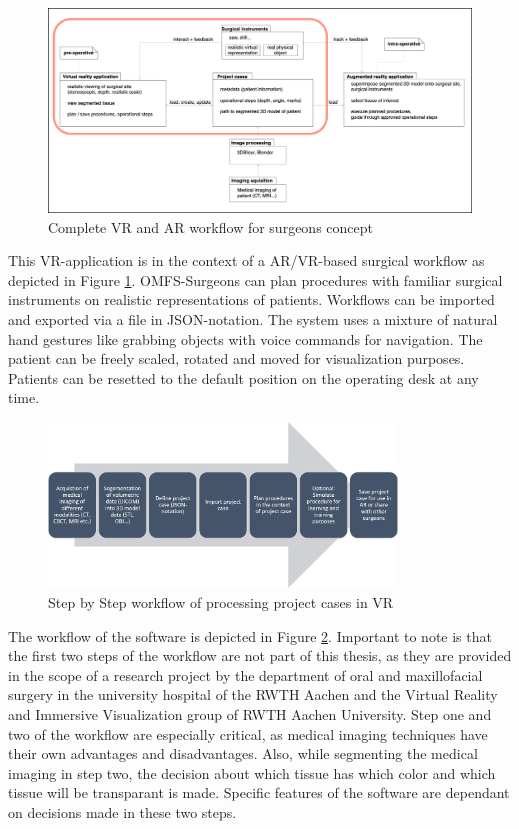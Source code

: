 \begin{figure}[ht]
    \centering
    \includegraphics[width=\linewidth]{images/project_plan.png}
    \caption{\label{fig::ProjectPlan} Complete VR and AR workflow for surgeons concept}
\end{figure}

This VR-application is in the context of a AR/VR-based surgical workflow as depicted in Figure \ref{fig::ProjectPlan}.
OMFS-Surgeons can plan procedures with familiar surgical instruments on realistic representations of patients.
Workflows can be imported and exported via a file in JSON-notation.
The system uses a mixture of natural hand gestures like grabbing objects with voice commands for navigation.
The patient can be freely scaled, rotated and moved for visualization purposes.
Patients can be resetted to the default position on the operating desk at any time.

\begin{figure}[ht]
    \centering
    \includegraphics[width=350px]{images/implementation/workflow.png}
    \caption{\label{fig::ImplementationWorkflow}Step by Step workflow of processing project cases in VR}
\end{figure}

The workflow of the software is depicted in Figure \ref{fig::ImplementationWorkflow}.
Important to note is that the first two steps of the workflow are not part of this thesis, as they are provided in the scope of a research project by the department of oral and maxillofacial surgery in the university hospital of the RWTH Aachen and the Virtual Reality and Immersive Visualization group of RWTH Aachen University.
Step one and two of the workflow are especially critical, as medical imaging techniques have their own advantages and disadvantages.
Also, while segmenting the medical imaging in step two, the decision about which tissue has which color and which tissue will be transparant is made.
Specific features of the software are dependant on decisions made in these two steps.

